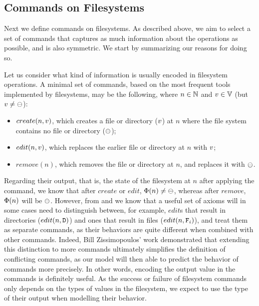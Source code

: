 
\subsection{Commands on Filesystems}


Next we define commands on filesystems.
As described above, we aim to select a set of commands
that captures as much information
about the operations as possible, and is also symmetric.
We start by summarizing our reasons for doing so.


Let us consider what kind of information is usually encoded in filesystem operations.
A minimal set of commands, based on the most frequent tools implemented by filesystems,
may be the following, where 
$n\in\mathbb{N}$ and $v\in\mathbb{V}$ (but $v\neq\ominus$):
\begin{itemize}
\item $create(n,v)$, which creates a file or directory ($v$) at $n$
where the file system contains no file or directory ($\ominus$);
\item $edit(n,v)$, which replaces the earlier file or directory at $n$ with $v$;
\item $remove(n)$, which removes the file or directory at $n$, and replaces it with $\ominus$.
\end{itemize}
Regarding their output, that is, the state of the filesystem at $n$
after applying the command,
we know that after $create$ or $edit$, $\Phi(n)\neq\ominus$, whereas after $remove$,
$\Phi(n)$ will be $\ominus$. 
However, from \cite{NREC} and \cite{CBNR} we know that a useful set of axioms
will in some cases need to distinguish between, for example,
$edit$s that result in directories ($edit(n,\mathtt{D})$) and
ones that result in files ($edit(n,\mathtt{F}_i)$), and treat them as separate commands,
as their behaviors are quite different when combined with other commands.
Indeed, Bill Zissimopoulos' work
demonstrated \cite{BZ}
that extending this distinction to more commands ultimately simplifies
the definition of conflicting commands, as our model will then able to predict the behavior of commands
more precisely.
In other words, encoding the output value in the commands is definitely useful.
As the success or failure of filesystem commands only depends on the types of values in the filesystem,
we expect to use the type of their output when modelling their behavior.

